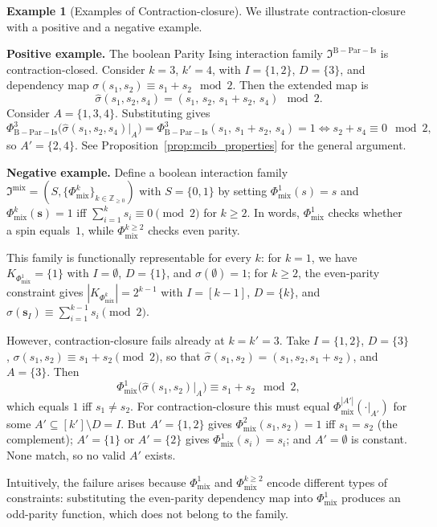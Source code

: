 \documentclass[11pt,reqno]{amsart}
\newcommand{\vecs}{\boldsymbol{s}}
\newcommand{\IFam}{\mathfrak{I}}
\newcommand{\mcib}{\mathfrak{I}^{\mathrm{B-Par-Is}}}
\newcommand{\PhibIs}{\Phi_{\mathrm{B-Par-Is}}}
\theoremstyle{plain}
\theoremstyle{definition}
\newtheorem{example}[theorem]{Example}
\numberwithin{equation}{section}
\begin{document}
\begin{example}[Examples of Contraction-closure]
\label{ex:contraction_closure}
We illustrate contraction-closure with a positive and a negative example.

\textbf{Positive example.} The boolean Parity Ising interaction family $\mcib$ is con\-traction-closed. Consider $k = 3$, $k' = 4$, with $I = \{1,2\}$, $D = \{3\}$, and dependency map $\sigma(s_1, s_2) \equiv s_1 + s_2 \mod 2$. Then the extended map is
\[
    \hat\sigma(s_1, s_2, s_4) = (s_1,\, s_2,\, s_1 + s_2,\, s_4) \mod 2.
\]
Consider $A = \{1, 3, 4\}$. Substituting gives
\[
    \PhibIs^{3}\!\big(\hat\sigma(s_1, s_2, s_4)|_A\big) = \PhibIs^{3}(s_1,\, s_1 + s_2,\, s_4) = 1 \iff s_2 + s_4 \equiv 0 \mod 2,
\]
so $A' = \{2, 4\}$. See Proposition~\ref{prop:mcib_properties} for the general argument.

\textbf{Negative example.} Define a boolean interaction family $\IFam^{\mathrm{mix}} = (S, \{\Phi^k_{\mathrm{mix}}\}_{k \in \mathbb{Z}_{\geq 0}})$ with $S = \{0,1\}$ by setting $\Phi^1_{\mathrm{mix}}(s) = s$ and $\Phi^k_{\mathrm{mix}}(\vecs) = 1$ iff $\sum_{i=1}^{k} s_i \equiv 0 \pmod 2$ for $k \geq 2$. In words, $\Phi^1_{\mathrm{mix}}$ checks whether a spin equals~$1$, while $\Phi^{k \geq 2}_{\mathrm{mix}}$ checks even parity.

This family is functionally representable for every $k$: for $k = 1$, we have $K_{\Phi^1_{\mathrm{mix}}} = \{1\}$ with $I = \emptyset$, $D = \{1\}$, and $\sigma(\emptyset) = 1$; for $k \geq 2$, the even-parity constraint gives $|K_{\Phi^k_{\mathrm{mix}}}| = 2^{k-1}$ with $I = [k-1]$, $D = \{k\}$, and $\sigma(\vecs_I) \equiv \sum_{i=1}^{k-1} s_i \pmod 2$.

However, contraction-closure fails already at $k = k' = 3$. Take $I = \{1,2\}$, $D = \{3\}$, $\sigma(s_1, s_2) \equiv s_1 + s_2 \pmod 2$, so that $\hat\sigma(s_1, s_2) = (s_1, s_2, s_1 + s_2)$, and $A = \{3\}$. Then
\[
    \Phi^1_{\mathrm{mix}}\!\big(\hat\sigma(s_1, s_2)|_A\big) \equiv s_1 + s_2 \mod 2,
\]
which equals $1$ iff $s_1 \neq s_2$. For contraction-closure this must equal $\Phi^{|A'|}_{\mathrm{mix}}(\cdot|_{A'})$ for some $A' \subseteq [k'] \setminus D = I$. But $A' = \{1,2\}$ gives $\Phi^2_{\mathrm{mix}}(s_1, s_2) = 1$ iff $s_1 = s_2$ (the complement); $A' = \{1\}$ or $A' = \{2\}$ gives $\Phi^1_{\mathrm{mix}}(s_i) = s_i$; and $A' = \emptyset$ is constant. None match, so no valid $A'$ exists.

Intuitively, the failure arises because $\Phi^1_{\mathrm{mix}}$ and $\Phi^{k \geq 2}_{\mathrm{mix}}$ encode different types of constraints: substituting the even-parity dependency map into $\Phi^1_{\mathrm{mix}}$ produces an odd-parity function, which does not belong to the family.
\end{example}
\end{document}
